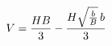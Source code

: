 \documentclass[preview]{standalone}
\begin{document}
\begin{align*}
\special{dvisvgm:raw <g id='unique000'>}V=\frac{HB}{3}-\frac{H\sqrt{\frac{b}{B}}\,b}{3}\special{dvisvgm:raw </g>}
\end{align*}
\end{document}
